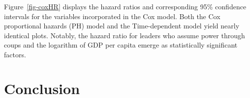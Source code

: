 \documentclass[
  12pt,
  a4paper,
  12pt]{article}
\begin{document}
Figure~\ref{fig-coxHR} displays the hazard ratios and corresponding 95\%
confidence intervals for the variables incorporated in the Cox model.
Both the Cox proportional hazards (PH) model and the Time-dependent
model yield nearly identical plots. Notably, the hazard ratio for
leaders who assume power through coups and the logarithm of GDP per
capita emerge as statistically significant factors.

\newpage

\section{Conclusion}\label{conclusion}

\newpage


\renewcommand\refname{References}
  
\end{document}
